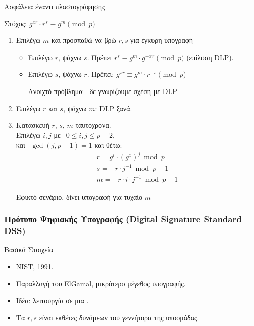 \documentclass[handout]{beamer}
\begin{document}
\begin{frame}[allowframebreaks]{Ασφάλεια έναντι πλαστογράφησης}

\alert{Στόχος: $g^{xr} \cdot r^s \equiv g^{m} \pmod p$}

\begin{enumerate}
\item Επιλέγω $m$ και προσπαθώ να βρώ $r,s$ για έγκυρη υπογραφή
\begin{itemize}
\item Επιλέγω $r$, ψάχνω $s$. Πρέπει
$r^s \equiv g^{m} \cdot g^{-xr} \pmod p$ (επίλυση DLP).

\item Επιλέγω $s$, ψάχνω $r$. Πρέπει:
$g^{xr}  \equiv g^{m} \cdot r^{-s} \pmod p$

Ανοιχτό πρόβλημα - δε γνωρίζουμε σχέση με DLP 
\end{itemize}
 

\item Επιλέγω $r$ και $s$, ψάχνω $m$: DLP ξανά.

\framebreak

\item Κατασκευή $r$, $s$, $m$ ταυτόχρονα.\\
Επιλέγω $i,j$
με $ \ \ 0\leq i,j \leq p-2, $\\
και $ \ \  \gcd(j,p-1)=1$  και θέτω: \\
\begin{align*}
 r=g^{i} \cdot (g^{x})^j \bmod p \\
 s = -r\cdot j^{-1} \bmod {p-1} \\
 m = -r\cdot i\cdot j^{-1} \bmod {p-1}
\end{align*}


\alert{Εφικτό σενάριο, δίνει υπογραφή για τυχαίο $m$}


\end{enumerate}
 
\end{frame}

\begin{frame}
\frametitle{Πρότυπο Ψηφιακής Υπογραφής (Digital Signature Standard -- DSS)} 

\begin{block}{Βασικά Στοιχεία}
\begin{itemize}
\item NIST, 1991.
\pause
\item Παραλλαγή του ElGamal, μικρότερο μέγεθος υπογραφής.
\pause
\item Ιδέα: λειτουργία σε μια .
\pause
\item Τα $r, s$ είναι εκθέτες δυνάμεων του γεννήτορα της υποομάδας.
\end{itemize}
\end{block}
\end{frame}
\end{document}
